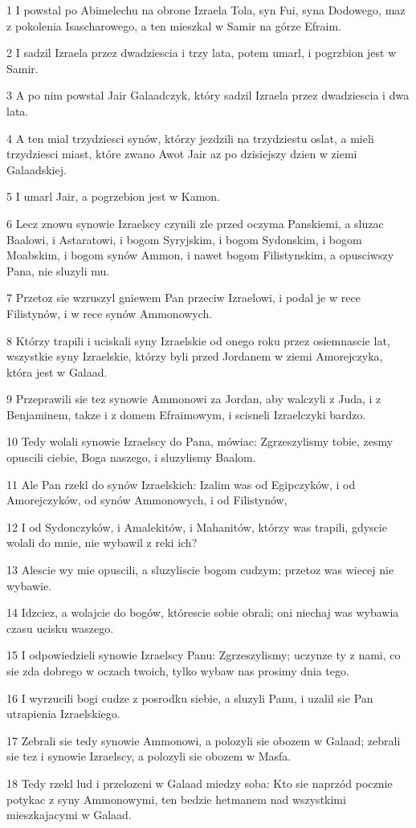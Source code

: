 \par 1 I powstal po Abimelechu na obrone Izraela Tola, syn Fui, syna Dodowego, maz z pokolenia Isascharowego, a ten mieszkal w Samir na górze Efraim.
\par 2 I sadzil Izraela przez dwadziescia i trzy lata, potem umarl, i pogrzbion jest w Samir.
\par 3 A po nim powstal Jair Galaadczyk, który sadzil Izraela przez dwadziescia i dwa lata.
\par 4 A ten mial trzydziesci synów, którzy jezdzili na trzydziestu oslat, a mieli trzydziesci miast, które zwano Awot Jair az po dzisiejszy dzien w ziemi Galaadskiej.
\par 5 I umarl Jair, a pogrzebion jest w Kamon.
\par 6 Lecz znowu synowie Izraelscy czynili zle przed oczyma Panskiemi, a sluzac Baalowi, i Astaratowi, i bogom Syryjskim, i bogom Sydonskim, i bogom Moabskim, i bogom synów Ammon, i nawet bogom Filistynskim, a opusciwszy Pana, nie sluzyli mu.
\par 7 Przetoz sie wzruszyl gniewem Pan przeciw Izraelowi, i podal je w rece Filistynów, i w rece synów Ammonowych.
\par 8 Którzy trapili i uciskali syny Izraelskie od onego roku przez osiemnascie lat, wszystkie syny Izraelskie, którzy byli przed Jordanem w ziemi Amorejczyka, która jest w Galaad.
\par 9 Przeprawili sie tez synowie Ammonowi za Jordan, aby walczyli z Juda, i z Benjaminem, takze i z domem Efraimowym, i scisneli Izraelczyki bardzo.
\par 10 Tedy wolali synowie Izraelscy do Pana, mówiac: Zgrzeszylismy tobie, zesmy opuscili ciebie, Boga naszego, i sluzylismy Baalom.
\par 11 Ale Pan rzekl do synów Izraelskich: Izalim was od Egipczyków, i od Amorejczyków, od synów Ammonowych, i od Filistynów,
\par 12 I od Sydonczyków, i Amalekitów, i Mahanitów, którzy was trapili, gdyscie wolali do mnie, nie wybawil z reki ich?
\par 13 Alescie wy mie opuscili, a sluzyliscie bogom cudzym; przetoz was wiecej nie wybawie.
\par 14 Idzciez, a wolajcie do bogów, którescie sobie obrali; oni niechaj was wybawia czasu ucisku waszego.
\par 15 I odpowiedzieli synowie Izraelscy Panu: Zgrzeszylismy; uczynze ty z nami, co sie zda dobrego w oczach twoich, tylko wybaw nas prosimy dnia tego.
\par 16 I wyrzucili bogi cudze z posrodku siebie, a sluzyli Panu, i uzalil sie Pan utrapienia Izraelskiego.
\par 17 Zebrali sie tedy synowie Ammonowi, a polozyli sie obozem w Galaad; zebrali sie tez i synowie Izraelscy, a polozyli sie obozem w Masfa.
\par 18 Tedy rzekl lud i przelozeni w Galaad miedzy soba: Kto sie naprzód pocznie potykac z syny Ammonowymi, ten bedzie hetmanem nad wszystkimi mieszkajacymi w Galaad.

